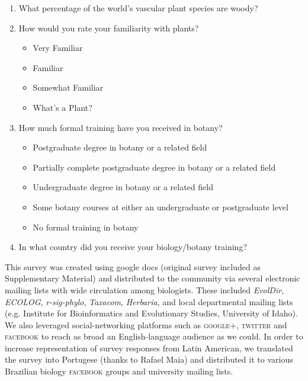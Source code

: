 \documentclass[12pt]{article}
\begin{document}
\begin{enumerate}

\item What percentage of the world's vascular plant species are woody?

\item How would you rate your familiarity with plants?

	\begin{itemize}
	
		\item Very Familiar
	
		\item Familiar
	
		\item Somewhat Familiar
	
		\item What's a Plant?
	
	\end{itemize}
	
\item How much formal training have you received in botany?

	\begin{itemize}
	
		\item Postgraduate degree in botany or a related field
		
		\item Partially complete postgraduate degree in botany or a related field
		
		\item Undergraduate degree in botany or a related field
		
		\item Some botany courses at either an undergraduate or postgraduate level
		
		\item No formal training in botany
		
	\end{itemize}
	
\item In what country did you receive your biology/botany training?

\end{enumerate}

This survey was created using google docs (original survey included as Supplementary Material) and distributed to the community via several electronic mailing lists with wide circulation among biologists. These included \emph{EvolDir}, \emph{ECOLOG}, \emph{r-sig-phylo}, \emph{Taxacom}, \emph{Herbaria}, and local departmental mailing lists (e.g. Institute for Bioinformatics and Evolutionary Studies, University of Idaho). We also leveraged social-networking platforms such as \textsc{google+}, \textsc{twitter} and \textsc{facebook} to reach as broad an English-language audience as we could. In order to increase representation of survey responses from Latin American, we translated the survey into Portugese (thanks to Rafael Maia) and distributed it to various Brazilian biology \textsc{facebook} groups and university mailing lists.
\end{document}
